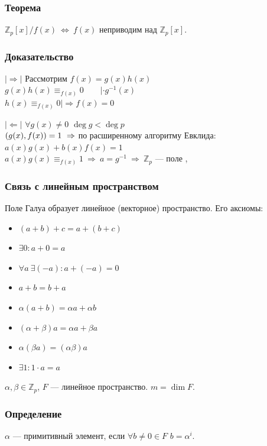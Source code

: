 \documentclass[12pt]{article}
\let\gcd\relax
\DeclareMathOperator{\gcd}{НОД}
\begin{document}
\subsubsection{Теорема}
$\mathbb{Z}_p[x] / f(x)\ \Leftrightarrow\ f(x)$ неприводим над $\mathbb{Z}_p[x]$.

\subsubsection{Доказательство}
$|\Rightarrow|$ Рассмотрим $f(x) = g(x)h(x)$ \\
$g(x)h(x) \equiv_{f(x)} 0 \qquad | \cdot g^{-1}(x) $ \\
$h(x) \equiv_{f(x)} 0 |\Rightarrow f(x) = 0$

$|\Leftarrow|$ $\forall g(x) \neq 0$ $\deg g < \deg p$ \\
$\gcd(g(x), f(x)) = 1\ \Rightarrow$ по расширенному алгоритму Евклида:\\
$a(x)g(x) + b(x)f(x) = 1$ \\
$a(x)g(x) \equiv_{f(x)} 1\ \Rightarrow\ a = g^{-1} \ \Rightarrow\ \mathbb{Z}_p$ — поле
,
\subsubsection{Связь с линейным пространством}
Поле Галуа образует линейное (векторное) пространство. Его аксиомы:
\begin{itemize}
    \item $(a + b) + c = a + (b + c)$
    \item $\exists 0 : a + 0 = a$
    \item $\forall a \  \exists(-a) : a + (-a) = 0$
    \item $a + b = b + a$
    \item $\alpha(a + b) = \alpha a + \alpha b$
    \item $(\alpha + \beta)a = \alpha a + \beta a$
    \item $\alpha(\beta a) = (\alpha \beta) a$
    \item $\exists 1 : 1 \cdot a = a$
\end{itemize}

$\alpha, \beta \in \mathbb{Z}_p$, $F$ — линейное пространство. $m = \dim F$.

\subsubsection{Определение}
$\alpha$ — примитивный элемент, если $\forall b \neq 0 \in F$ \qquad $b = \alpha^i$.
\end{document}
